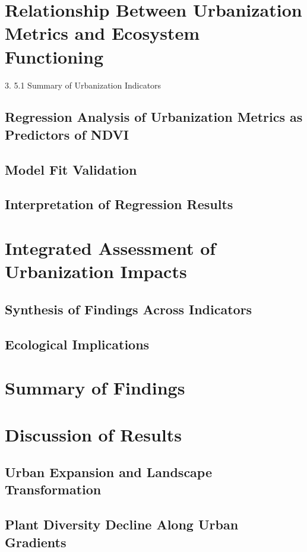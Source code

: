 \section{Relationship Between Urbanization Metrics and Ecosystem Functioning}
\label{section:3-5}

3. 5.1 Summary of Urbanization Indicators 
\subsection{Regression Analysis of Urbanization Metrics as Predictors of NDVI}
\label{subsection:3-5-2}
\subsection{Model Fit Validation}
\label{subsection:3-5-3}
\subsection{Interpretation of Regression Results}
\label{subsection:3-5-4}
\section{Integrated Assessment of Urbanization Impacts}
\label{section:3-6}
\subsection{Synthesis of Findings Across Indicators}
\label{subsection:3-6-1}
\subsection{Ecological Implications}
\label{subsection:3-6-2}
\section{Summary of Findings}
\label{section:3-7}
\section{Discussion of Results}
\label{section:3-8}
\subsection{Urban Expansion and Landscape Transformation}
\label{subsection:3-8-1}
\subsection{Plant Diversity Decline Along Urban Gradients}
\label{subsection:3-8-2}
